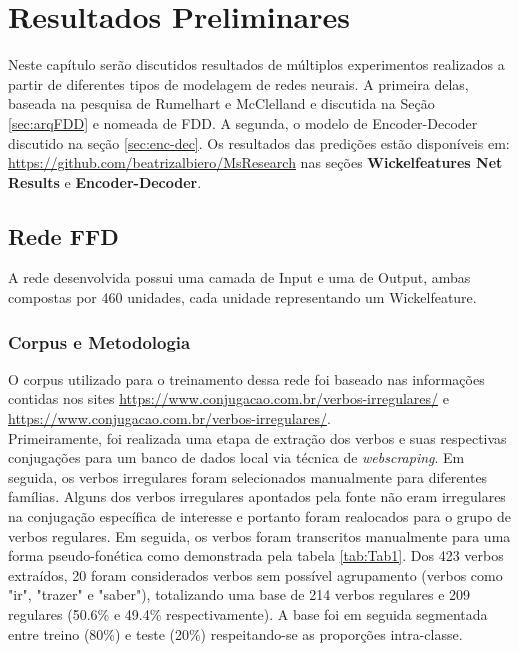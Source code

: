 \chapter{Resultados Preliminares}
\label{ch:03-results}


Neste capítulo serão discutidos resultados de múltiplos experimentos realizados a partir de diferentes tipos de modelagem de redes neurais. A primeira delas, baseada na pesquisa de Rumelhart e McClelland e discutida na Seção \ref{sec:arqFDD} e nomeada de FDD.
A segunda, o modelo de Encoder-Decoder discutido na seção \ref{sec:enc-dec}. Os resultados das predições estão disponíveis em: 
\url{https://github.com/beatrizalbiero/MsResearch} nas seções \textbf{Wickelfeatures Net Results} e \textbf{Encoder-Decoder}.


\section{Rede FFD}
\label{sec:ffd}

A rede desenvolvida possui uma camada de Input e uma de Output, ambas compostas por 460 unidades, cada unidade representando um Wickelfeature.

\subsection{Corpus e Metodologia}
\label{sec:corpus-ffd}

O corpus utilizado para o treinamento dessa rede foi baseado nas informações contidas nos sites \url{https://www.conjugacao.com.br/verbos-irregulares/} e \url{https://www.conjugacao.com.br/verbos-irregulares/}.\\

Primeiramente, foi realizada uma etapa de extração dos verbos e suas respectivas conjugações para um banco de dados local via técnica de \textit{webscraping}. Em seguida, os verbos irregulares foram selecionados manualmente para diferentes famílias. Alguns dos verbos irregulares apontados pela fonte não eram irregulares na conjugação específica de interesse e portanto foram realocados para o grupo de verbos regulares. Em seguida, os verbos foram transcritos manualmente para uma forma pseudo-fonética como demonstrada pela tabela \ref{tab:Tab1}. Dos 423 verbos extraídos, 20 foram considerados verbos sem possível agrupamento (verbos como "ir", "trazer" e "saber"), totalizando uma base de 214 verbos regulares e 209 regulares (50.6\% e 49.4\% respectivamente). A base foi em seguida segmentada entre treino (80\%) e teste (20\%) respeitando-se as proporções intra-classe.  


